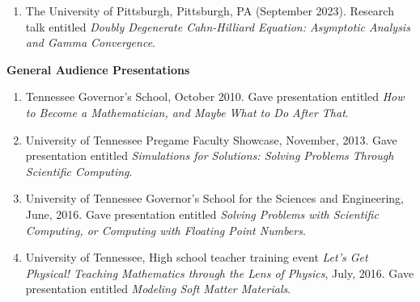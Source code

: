 \documentclass[11pt]{letter}
\begin{document}
\begin{enumerate}
	\item
The University of Pittsburgh, Pittsburgh, PA (September 2023).  Research talk entitled {\sl Doubly Degenerate Cahn-Hilliard Equation: Asymptotic Analysis and Gamma Convergence}.

	\end{enumerate}

	\smallskip

{\LARGE\bf General Audience Presentations}

    \begin{enumerate}
    \item
Tennessee Governor's School, October 2010. Gave presentation entitled {\sl How to Become a Mathematician, and Maybe What to Do After That}.
    
    \item
University of Tennessee Pregame Faculty Showcase, November, 2013. Gave presentation entitled {\sl Simulations for Solutions: Solving Problems Through Scientific Computing}.
    
    \item
University of Tennessee Governor's School for the Sciences and Engineering, June, 2016. Gave presentation entitled {\sl Solving Problems with Scientific Computing, or Computing with Floating Point Numbers}.

	\item
University of Tennessee, High school teacher training event {\sl Let's Get Physical! Teaching Mathematics through the Lens of Physics}, July, 2016. Gave presentation entitled {\sl  Modeling Soft Matter Materials}.

	\end{enumerate}
	
	\smallskip
	
\end{document}
